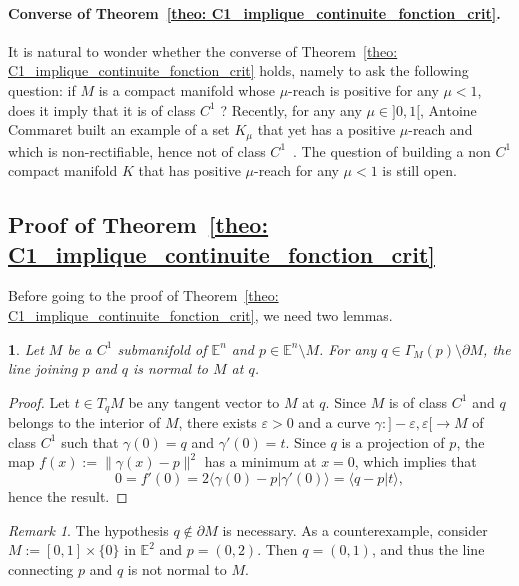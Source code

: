 \documentclass[11pt,reqno,a4paper]{article}%
\newtheorem{lemma}[theorem]{\sc{Lemma}}
\theoremstyle{definition}
\theoremstyle{remark}
\newtheorem{remark}{Remark}[section]
\newcommand{\sca}[2]{\langle #1 | #2\rangle}
\newcommand{\E}{\mathbb{E}}
\begin{document}
\paragraph{Converse of Theorem~\ref{theo: C1_implique_continuite_fonction_crit}.} 
It is natural to wonder whether the converse of Theorem~\ref{theo: C1_implique_continuite_fonction_crit} holds, namely to ask the following question: if $M$ is a compact manifold whose $\mu$-reach is positive for any $\mu<1$, does it imply that it is of class $C^1$ ? 
Recently, for any any $\mu \in ]0,1[$, Antoine Commaret built an example of a set $K_\mu$ that yet has a positive $\mu$-reach and which is non-rectifiable, hence not of class $C^1$~\cite[pp 31 to 37]{TheseCommaret}. The question of building a non $C^1$ compact manifold $K$ that has positive $\mu$-reach for any $\mu<1$ is still open.


\subsection{Proof of Theorem~\ref{theo: C1_implique_continuite_fonction_crit}}
Before going to the proof of Theorem~\ref{theo: C1_implique_continuite_fonction_crit}, we need two lemmas.

\begin{lemma} \label{lem_normale_distnace_min_variete}
Let $M$ be a $C^1$ submanifold of $\E^n$  and $p \in \E^n \setminus M$.
For any $q \in\Gamma_M(p) \setminus \partial M$, the line joining $p$ and $q$ is normal to $M$ at $q$.
\end{lemma}

\begin{proof}
Let $t\in T_q M$ be any tangent vector to $M$ at $q$. Since $M$ is of class $C^1$ and $q$ belongs to the interior of $M$, there exists $\varepsilon>0$ and a curve $\gamma:]-\varepsilon,\varepsilon[\to M$ of class $C^1$ such that $\gamma(0) = q$ and $\gamma'(0) = t$. Since $q$ is a projection of $p$, the map $f(x):=\|\gamma(x)-p\|^2$ has a minimum at $x=0$, which implies that 
$$
0=f'(0) = 2 \sca{\gamma(0)- p}{\gamma'(0)}=\sca{q-p}{t},
$$
hence the result.
\end{proof}

\begin{remark}
The hypothesis $q \notin \partial M$ is necessary. 
As a counterexample, consider $M := [0,1] \times \{ 0 \}$ in $\E^2$ and $p = (0,2)$. Then $q= (0,1)$, and thus the line connecting $p$ and $q$ is not normal to $M$.
\end{remark}
\end{document}
